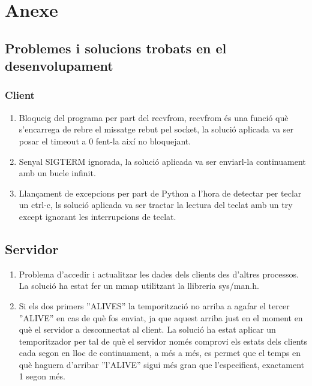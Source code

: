 \documentclass[11pt]{article}
\begin{document}
\section{Anexe}
	\subsection{Problemes i solucions trobats en el desenvolupament}
		\subsubsection*{Client}
\begin{enumerate}
\item Bloqueig del programa per part del recvfrom, recvfrom és una funció què s'encarrega de rebre el missatge rebut pel socket, la solució aplicada va ser posar el timeout a 0 fent-la així no bloquejant.
\item Senyal SIGTERM ignorada, la solució aplicada va ser enviarl-la continuament amb un bucle infinit.
\item Llançament de excepcions per part de Python a l'hora de detectar per teclar un ctrl-c, ls solució aplicada va ser tractar la lectura del teclat amb un try except ignorant les interrupcions de teclat.
\end{enumerate}
		\subsection*{Servidor}
\begin{enumerate}
\item Problema d'accedir i actualitzar les dades dels clients des d'altres processos. La solució ha estat fer un mmap utilitzant la llibreria sys/man.h.
\item Si els dos primers ''ALIVES'' la temporització no arriba a agafar el tercer ''ALIVE'' en cas de què fos enviat, ja que aquest arriba just en el moment en què el servidor a desconnectat al client. La solució ha estat aplicar un temporitzador per tal de què el servidor només comprovi els estats dels clients cada segon en lloc de continuament, a més a més, es permet que el temps en què haguera d'arribar ''l'ALIVE'' sigui més gran que l'especificat, exactament 1 segon més.
\end{enumerate}
\newpage
\end{document}
